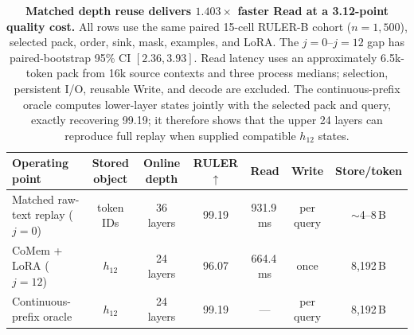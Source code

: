 \begin{table}[!t]
\centering
\scriptsize
\setlength{\tabcolsep}{4.2pt}
\begin{tabular}{@{}lcccccc@{}}
\toprule
\textbf{Operating point} & \textbf{Stored object} & \textbf{Online depth} &
\textbf{RULER}$\uparrow$ & \textbf{Read} & \textbf{Write} &
\textbf{Store/token} \\
\midrule
Matched raw-text replay ($j{=}0$) & token IDs & 36 layers &
99.19 & 931.9\,ms & per query & $\sim$4--8\,B \\
CoMem + LoRA ($j{=}12$) & $h_{12}$ & 24 layers &
96.07 & 664.4\,ms & once & 8,192\,B \\
Continuous-prefix oracle & $h_{12}$ & 24 layers &
99.19 & --- & per query & 8,192\,B \\
\bottomrule
\end{tabular}
\caption{\textbf{Matched depth reuse delivers $1.403\times$ faster Read at a
3.12-point quality cost.}
All rows use the same paired 15-cell RULER-B cohort ($n{=}1{,}500$), selected
pack, order, sink, mask, examples, and LoRA. The $j{=}0$--$j{=}12$ gap has
paired-bootstrap 95\% CI $[2.36,3.93]$. Read latency uses an approximately
6.5k-token pack from 16k source contexts and three process medians; selection,
persistent I/O, reusable Write, and decode are excluded. The
continuous-prefix oracle computes lower-layer states jointly with the selected
pack and query, exactly recovering 99.19; it therefore shows that the upper
24 layers can reproduce full replay when supplied compatible $h_{12}$ states.}
\label{tab:core-tradeoff}
\end{table}
